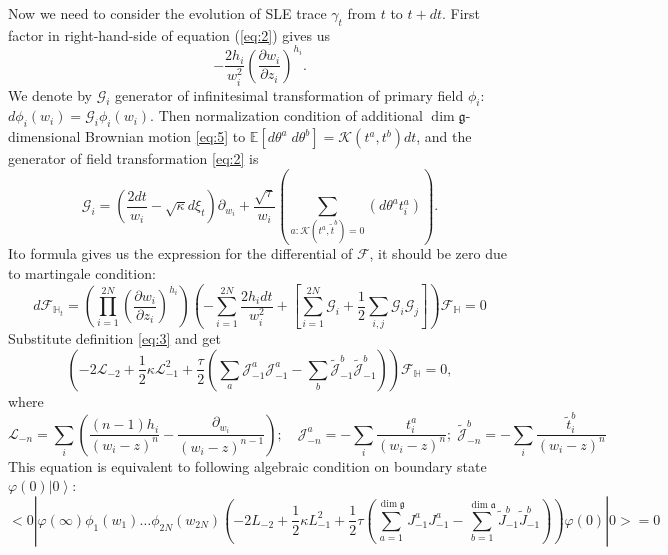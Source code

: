 \documentclass[a4paper]{article}
\theoremstyle{definition}
\newcommand{\gf}{\mathfrak{g}}
\newcommand{\af}{\mathfrak{a}}
\theoremstyle{definition} \newtheorem{Def}{Definition}
\begin{document}
Now we need to consider the evolution of SLE trace $\gamma_{t}$ from  $t$ to $t+ dt$. First factor in right-hand-side of equation (\ref{eq:2}) gives us
\begin{equation*}
  -\frac{2h_{i}}{w_{i}^{2}}\left(\frac{\partial w_{i}}{\partial z_{i}}\right)^{h_{i}}.
\end{equation*}
We denote by $\mathcal{G}_{i}$ generator of infinitesimal transformation of primary field $\phi_{i}$:$d\phi_{i}(w_{i}) = \mathcal{G}_{i}\phi_{i}(w_{i})$. Then normalization condition of additional $\dim\gf$-dimensional Brownian motion \eqref{eq:5} to $\mathbb{E}\left[d\theta^{a}\; d\theta^{b}\right]=\mathcal{K}(t^{a},t^{b})dt$, and the generator of field transformation \eqref{eq:2} is
\begin{equation}
  \mathcal{G}_{i}=\left(\frac{2dt}{w_{i}}-\sqrt{\kappa} d\xi_{t}\right) \partial_{w_{i}}+\frac{\sqrt{\tau}}{w_{i}}\left(\sum_{a:\mathcal{K}(t^{a},\tilde{t}^{b})=0}\left(d \theta ^{a} t^{a}_{i}\right)\right).
\label{eq:3}
\end{equation}
 Ito formula  gives us the expression for the differential of $\mathcal{F}$, it should be zero due to martingale condition:
\begin{equation}
d \mathcal{F}_{\mathbb{H}_{t}}= \left(\prod_{i=1}^{2N}\left(\frac{\partial w_{i}}{\partial z_{i}}\right)^{h_{i}}\right)\left(-\sum_{i=1}^{2N}\frac{2h_{i}dt}{w_{i}^{2}}+\left[\sum_{i=1}^{2N}\mathcal{G}_{i}+\frac{1}{2}
      \sum_{i,j}\mathcal{G}_{i}\mathcal{G}_{j}\right]\right)\mathcal{F}_{\mathbb{H}}=0
\label{eq:8}
\end{equation}
Substitute definition \eqref{eq:3} and get 
\begin{equation}
  \left(-2 \mathcal{L}_{-2}+\frac{1}{2}\kappa \mathcal{L}_{-1}^{2}+\frac{\tau}{2}\left( \sum_{a} \mathcal{J}^{a}_{-1} \mathcal{J}^{a}_{-1}-
      \sum_{b}\tilde{\mathcal{J}}^{b}_{-1} \tilde{\mathcal{J}}^{b}_{-1}\right)\right)        \mathcal{F}_{\mathbb{H}}=0,
  \label{eq:4}
\end{equation}
where
\begin{equation*}
  \mathcal{L}_{-n}=\sum_{i}\left(\frac{(n-1)h_{i}}{(w_{i}-z)^{n}}-\frac{\partial_{w_{i}}}{(w_{i}-z)^{n-1}}\right);\quad \mathcal{J}^{a}_{{-n}}=-\sum_{i}\frac{t^{a}_{i}}{(w_{i}-z)^{n}};\; \tilde{\mathcal{J}}^{b}_{{-n}}=-\sum_{i}\frac{\tilde{t}^{b}_{i}}{(w_{i}-z)^{n}}
\end{equation*}
This equation is equivalent to following algebraic condition on boundary state $\varphi(0)\left|0\right>$:
\begin{equation}
  \label{eq:7}
  <0|\varphi(\infty)\phi_{1}(w_{1})\dots\phi_{2N}(w_{2N})\left(-2L_{-2}+\frac{1}{2}\kappa L_{-1}^{2}+\frac{1}{2}\tau \left(\sum_{a=1}^{\dim\gf}J^{a}_{-1}J^{a}_{-1}-\sum_{b=1}^{\dim\af}\tilde{J}^{b}_{-1}\tilde{J}^{b}_{-1}\right)\right)\varphi(0)|0>=0
\end{equation}
\end{document}
